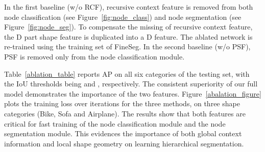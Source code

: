 \begin{table}[!t]\centering\small
{}\vspace{5pt}
\caption{Comparing our full model with two baselines (w/o RCF and w/o PSF) on FineSeg. AP() is measured with IoU threshold being  and , respectively.}
 \label{ablation_table}\vspace{-6pt}
\end{table}







In the first baseline (w/o RCF), recursive context feature is removed from both node classification (see Figure~\ref{fig:node_class}) and node segmentation (see Figure~\ref{fig:node_seg}). To compensate the missing of recursive context feature, the D part shape feature is duplicated into a D feature. The ablated network is re-trained using the training set of FineSeg.
In the second baseline (w/o PSF), PSF is removed only from the node classification module.



Table~\ref{ablation_table} reports AP on all six categories of the testing set, with the IoU thresholds being  and , respectively. The consistent superiority of our full model demonstrates the importance of the two features.
Figure~\ref{abalation_figure} plots the training loss over iterations for the three methods, on three shape categories (Bike, Sofa and Airplane). The results show that both features are critical for fast training of the node classification module and the node segmentation module. This evidences the importance of both global context information and local shape geometry on learning hierarchical segmentation.


